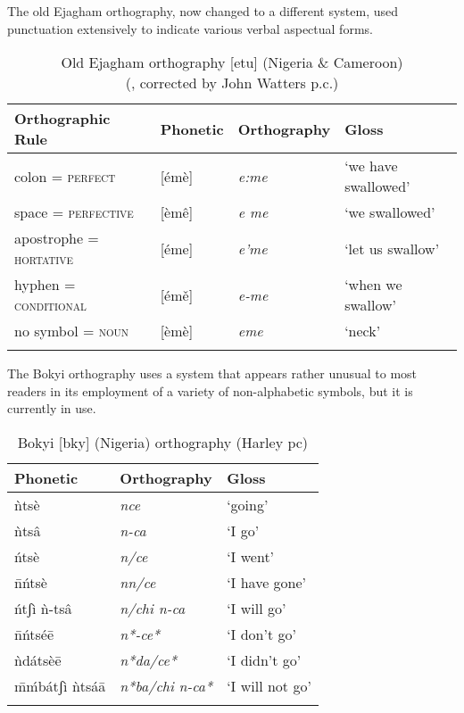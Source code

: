 \documentclass[output=paper]{langscibook}
\begin{document}
The old Ejagham orthography, now changed to a different system, used punctuation extensively to indicate various verbal aspectual forms.

    \begin{table}
        \begin{tabularx}{\textwidth}{llXl}
            \lsptoprule
            Orthographic Rule & Phonetic & Orthography & Gloss\\\midrule
            colon =  \textsc{perfect} & [émè] & \textit{e:me} & ‘we have swallowed’\\
            space =  \textsc{perfective} & [èmê] & \textit{e me} & ‘we swallowed’\\
            apostrophe = \textsc{hortative} & [éme] & \textit{e’me} & ‘let us swallow’\\
            hyphen =   \textsc{conditional} & [émě] & \textit{e-me} & ‘when we swallow’\\
            no symbol =  \textsc{noun} & [èmè] & \textit{eme} & ‘neck’\\
            \lspbottomrule
        \end{tabularx}
        \caption{Old Ejagham orthography [etu] (Nigeria \& Cameroon)\\
             (\citealt{Bird1999b}, corrected by John Watters p.c.)}
    \end{table}
    
The Bokyi orthography uses a system that appears rather unusual to most readers in its employment of a variety of non-alphabetic symbols, but it is currently in use.


    \begin{table}
        \begin{tabularx}{\textwidth}{XXX}
        \lsptoprule
        Phonetic & Orthography & Gloss\\\midrule
        ǹtsè & \textit{nce} & ‘going’\\
        ǹtsâ & \textit{n-ca}  & ‘I go’\\
        ńtsè & \textit{n/ce}  & ‘I went’  \\
        \={n}ńtsè & \textit{nn/ce} & ‘I have gone’\\
        ńtʃì ǹ-tsâ & \textit{n/chi  n-ca} & ‘I will go’\\
        \={n}ńtséē & \textit{n*-ce*} & ‘I don't go’\\
        ǹdátsèē & \textit{n*da/ce*}  & ‘I didn't go’\\
        \={m}ḿbátʃì ǹtsáā & \textit{n*ba/chi  n-ca*} & ‘I will not go’  \\
        \lspbottomrule
        \end{tabularx}
        \caption{Bokyi [bky] (Nigeria) orthography (Harley pc)}
        \label{bkm:Ref482111971}
    \end{table}
\end{document}
